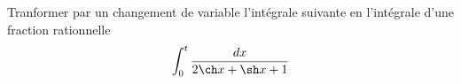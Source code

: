 Tranformer par un changement de variable l'int\'egrale suivante en l'int\'egrale d'une fraction rationnelle \[\int_0^t \frac{dx} {2\ch x +\sh x +1}\] \bigskip \bigskip \bigskip
